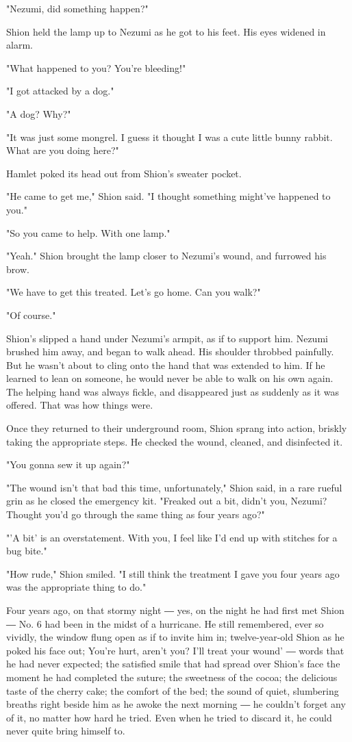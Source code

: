 "Nezumi, did something happen?"

Shion held the lamp up to Nezumi as he got to his feet. His eyes widened
in alarm.

"What happened to you? You're bleeding!"

"I got attacked by a dog."

"A dog? Why?"

"It was just some mongrel. I guess it thought I was a cute little bunny
rabbit. What are you doing here?"

Hamlet poked its head out from Shion's sweater pocket.

"He came to get me," Shion said. "I thought something might've happened
to you."

"So you came to help. With one lamp."

"Yeah." Shion brought the lamp closer to Nezumi's wound, and furrowed
his brow.

"We have to get this treated. Let's go home. Can you walk?"

"Of course."

Shion's slipped a hand under Nezumi's armpit, as if to support him.
Nezumi brushed him away, and began to walk ahead. His shoulder throbbed
painfully. But he wasn't about to cling onto the hand that was extended
to him. If he learned to lean on someone, he would never be able to walk
on his own again. The helping hand was always fickle, and disappeared
just as suddenly as it was offered. That was how things were.

Once they returned to their underground room, Shion sprang into action,
briskly taking the appropriate steps. He checked the wound, cleaned, and
disinfected it.

"You gonna sew it up again?"

"The wound isn't that bad this time, unfortunately," Shion said, in a
rare rueful grin as he closed the emergency kit. "Freaked out a bit,
didn't you, Nezumi? Thought you'd go through the same thing as four
years ago?"

"'A bit' is an overstatement. With you, I feel like I'd end up with
stitches for a bug bite."

"How rude," Shion smiled. "I still think the treatment I gave you four
years ago was the appropriate thing to do."

Four years ago, on that stormy night ― yes, on the night he had first
met Shion ― No. 6 had been in the midst of a hurricane. He still
remembered, ever so vividly, the window flung open as if to invite him
in; twelve-year-old Shion as he poked his face out; You're hurt, aren't
you? I'll treat your wound' ― words that he had never expected; the
satisfied smile that had spread over Shion's face the moment he had
completed the suture; the sweetness of the cocoa; the delicious taste of
the cherry cake; the comfort of the bed; the sound of quiet, slumbering
breaths right beside him as he awoke the next morning ― he couldn't
forget any of it, no matter how hard he tried. Even when he tried to
discard it, he could never quite bring himself to.

